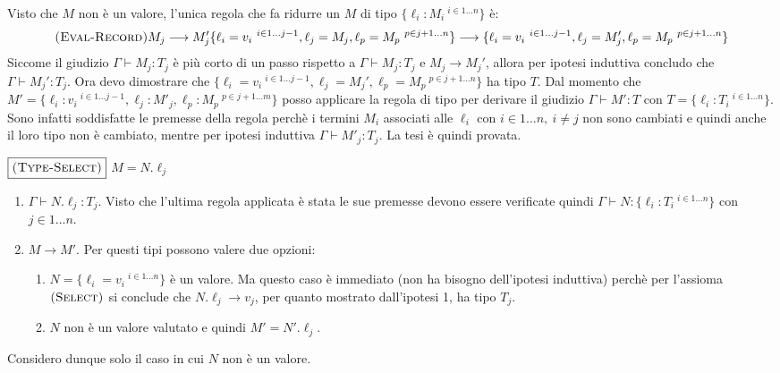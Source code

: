 		Visto che $M$ non \`e un valore, l'unica regola che fa ridurre un $M$ di tipo
		$ \{\ell_i : M_i\ ^{i \in 1 \dots n} \}$ \`e:
		$$
		{\textsc{(Eval-Record)}}
		{M_j \longrightarrow M_j'}
		{
			\{\ell_i = v_i\ ^{i \in 1 \dots j-1}, \ell_j = M_j, \ell_p = M_p\ ^{p \in j+1 \dots n}\}
			\longrightarrow 
			\{\ell_i = v_i\ ^{i \in 1 \dots j-1}, \ell_j = M_j', \ell_p = M_p\ ^{p \in j+1 \dots n}\}
		}
		$$
		Siccome il giudizio $\Gamma \vdash M_j : T_j$ \`e pi\`u corto di un passo rispetto
		a $\Gamma \vdash M_j : T_j$ e $M_j \longrightarrow M_j'$,
		allora per ipotesi induttiva concludo che $\Gamma \vdash M_j' : T_j$.
		Ora devo dimostrare che
		$\{\ell_i = v_i\ ^{i \in 1 \dots j-1}, \ell_j = M_j', \ell_p = M_p\ ^{p \in j+1 \dots n}\}$ ha tipo $T$.
		Dal momento che $M' = \{\ell_i : v_i\ ^{i \in 1 \dots j-1}, \ell_j : M'_j, \ell_p : M_p\ ^{p \in j+1 \dots m}\}$ posso applicare la regola di tipo  per derivare il giudizio $\Gamma \vdash M' : T$ con $T = \{ \ell_i : T_i \:^{i \in 1 \ldots n} \}$.
		Sono infatti soddisfatte le premesse della regola perch\`e i termini $M_i$ associati alle $\ell_i$ con $i \in 1 \ldots n,\: i \neq j$ non sono cambiati e quindi anche il loro tipo non \`e cambiato, mentre per ipotesi induttiva $\Gamma \vdash M'_j : T_j$.
		La tesi \`e quindi provata.

		\item $\boxed{\textsc{(Type-Select)}}$ $M = N.\ell_j$
		\begin{enumerate}
			\item $\Gamma \vdash N.\ell_j : T_j$. Visto che l'ultima regola applicata \`e stata  le sue premesse devono essere
			verificate quindi $\Gamma \vdash N : \{\ell_i : T_i\ ^{i \in 1 \dots n} \}$ con $j \in 1 \dots n$.
			\item $M \longrightarrow M'$. Per questi tipi possono valere due opzioni:
				\begin{enumerate}[label=\alph*)]
					\item $N = \{\ell_i = v_i\ ^{i \in 1 \dots n} \}$ \`e un valore. Ma questo
					caso \`e immediato (non ha bisogno dell'ipotesi induttiva) perch\`e per
					l'assioma $\textsc{(Select)}$ si conclude che $N.\ell_j \longrightarrow v_j$,
					per quanto mostrato dall'ipotesi 1, ha tipo $T_j$.
					\item $N$ non \`e un valore valutato e quindi $M'= N'.\ell_j$.
				\end{enumerate} 
		\end{enumerate}
		Considero dunque solo il caso in cui $N$ non \`e un valore.
		
